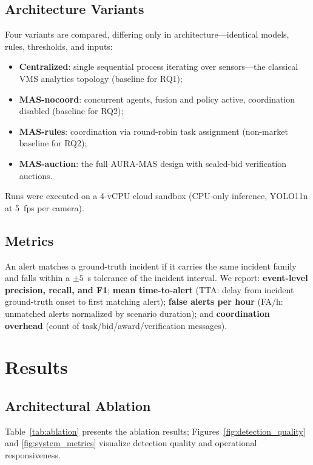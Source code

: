 \subsection{Architecture Variants}

Four variants are compared, differing only in architecture---identical models, rules, thresholds, and inputs:

\begin{itemize}
    \item \textbf{Centralized}: single sequential process iterating over sensors---the classical VMS analytics topology (baseline for RQ1);
    \item \textbf{MAS-nocoord}: concurrent agents, fusion and policy active, coordination disabled (baseline for RQ2);
    \item \textbf{MAS-rules}: coordination via round-robin task assignment (non-market baseline for RQ2);
    \item \textbf{MAS-auction}: the full AURA-MAS design with sealed-bid verification auctions.
\end{itemize}

Runs were executed on a 4-vCPU cloud sandbox (CPU-only inference, YOLO11n at 5~\gls{fps} per camera).

\subsection{Metrics}

An alert matches a ground-truth incident if it carries the same incident family and falls within a $\pm 5$~s tolerance of the incident interval. We report: \textbf{event-level precision, recall, and F1}; \textbf{mean time-to-alert} (TTA: delay from incident ground-truth onset to first matching alert); \textbf{false alerts per hour} (FA/h: unmatched alerts normalized by scenario duration); and \textbf{coordination overhead} (count of task/bid/award/verification messages).

\section{Results}

\subsection{Architectural Ablation}

Table~\ref{tab:ablation} presents the ablation results; Figures~\ref{fig:detection_quality} and \ref{fig:system_metrics} visualize detection quality and operational responsiveness.

